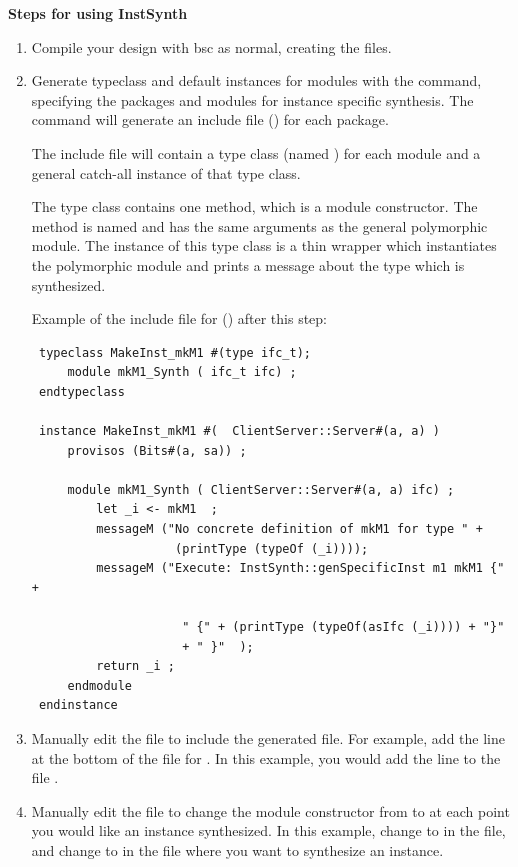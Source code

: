 {\bf Steps for using InstSynth}
 \begin{enumerate}

 \item  Compile your design with bsc as normal, creating the
  files.

 \item Generate typeclass and default instances for modules with
 the  command, specifying the packages and modules for 
 instance specific synthesis.   The  command will generate
 an include file () for each package.

  The include file will contain  a type class (named
   ) for each module and a general
   catch-all   instance of that type class.   

   The type class contains one method, which is a module constructor.
   The method is named  and has the same arguments as the
   general polymorphic module.  The instance of  this type class is
   a thin wrapper which instantiates the polymorphic module and prints
   a message about the type which is synthesized.

 Example of the include file for  ()
 after this step:
 \begin{verbatim}
 typeclass MakeInst_mkM1 #(type ifc_t);
     module mkM1_Synth ( ifc_t ifc) ;
 endtypeclass

 instance MakeInst_mkM1 #(  ClientServer::Server#(a, a) )
     provisos (Bits#(a, sa)) ;

     module mkM1_Synth ( ClientServer::Server#(a, a) ifc) ;
         let _i <- mkM1  ;
         messageM ("No concrete definition of mkM1 for type " +
                    (printType (typeOf (_i))));
         messageM ("Execute: InstSynth::genSpecificInst m1 mkM1 {" +

                     " {" + (printType (typeOf(asIfc (_i)))) + "}" 
                     + " }"  );
         return _i ;
     endmodule
 endinstance
 \end{verbatim}


 \item Manually edit the   file to  include the generated file.
 For example, add the line  at the
 bottom of the file for .  In this example, you would add the line
  to the file .

 \item Manually edit the  file to change the module
 constructor from  to  at each point you
 would like an instance synthesized.
 In this example, change   to  in the
  file, and change  to  in the
  file where you want to synthesize an instance.



\end{enumerate}
